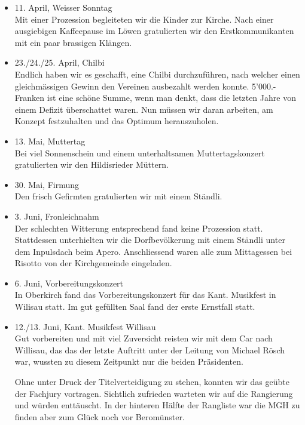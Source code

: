 \begin{history}
\begin{itemize}
        \item[]11. April, Weisser Sonntag\\
        Mit einer Prozession begleiteten wir die Kinder zur Kirche. Nach einer
        ausgiebigen Kaffeepause im Löwen gratulierten wir den Erstkommunikanten mit
        ein paar brassigen Klängen.

        \item[]23./24./25. April, Chilbi\\
        Endlich haben wir es geschafft, eine Chilbi durchzuführen, nach welcher
        einen gleichmässigen Gewinn den Vereinen ausbezahlt werden konnte.
        5'000.- Franken ist eine schöne Summe, wenn man denkt, dass die letzten
        Jahre von einem Defizit überschattet waren. Nun müssen wir daran
        arbeiten, am Konzept festzuhalten und das Optimum herauszuholen.

        \item[]13. Mai, Muttertag\\
        Bei viel Sonnenschein und einem unterhaltsamen Muttertagskonzert
        gratulierten wir den Hildisrieder Müttern.

        \item[]30. Mai, Firmung\\
        Den frisch Gefirmten gratulierten wir mit einem Ständli.

        \item[]3. Juni, Fronleichnahm\\
        Der schlechten Witterung entsprechend fand keine Prozession statt.
        Stattdessen unterhielten wir die Dorfbevölkerung mit einem Ständli
        unter dem Inpulsdach beim Apero. Anschliessend waren alle zum
        Mittagessen bei Risotto von der Kirchgemeinde eingeladen.

        \item[]6. Juni, Vorbereitungskonzert\\
        In Oberkirch fand das Vorbereitungskonzert für das Kant. Musikfest in
        Wilisau statt. Im gut gefüllten Saal fand der erste Ernstfall statt.

        \item[]12./13. Juni, Kant. Musikfest Willisau\\
        Gut vorbereiten und mit viel Zuversicht reisten wir mit dem Car nach
        Willisau, das das der letzte Auftritt unter der Leitung von Michael
        Rösch war, wussten zu diesem Zeitpunkt nur die beiden Präsidenten.

        Ohne unter Druck der Titelverteidigung zu stehen, konnten wir das geübte
        der Fachjury vortragen. Sichtlich zufrieden warteten wir auf die
        Rangierung und würden enttäuscht. In der hinteren Hälfte der Rangliste
        war die MGH zu finden aber zum Glück noch vor Beromünster.


\end{itemize}
\end{history}
